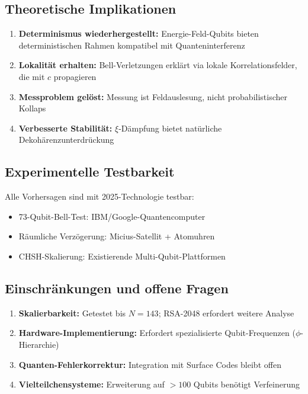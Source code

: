 \subsection{Theoretische Implikationen}

\begin{enumerate}
	\item \textbf{Determinismus wiederhergestellt:} Energie-Feld-Qubits bieten deterministischen Rahmen kompatibel mit Quanteninterferenz
	\item \textbf{Lokalität erhalten:} Bell-Verletzungen erklärt via lokale Korrelationsfelder, die mit $c$ propagieren
	\item \textbf{Messproblem gelöst:} Messung ist Feldauslesung, nicht probabilistischer Kollaps
	\item \textbf{Verbesserte Stabilität:} $\xi$-Dämpfung bietet natürliche Dekohärenzunterdrückung
\end{enumerate}

\subsection{Experimentelle Testbarkeit}

Alle Vorhersagen sind mit 2025-Technologie testbar:
\begin{itemize}
	\item 73-Qubit-Bell-Test: IBM/Google-Quantencomputer
	\item Räumliche Verzögerung: Micius-Satellit + Atomuhren
	\item CHSH-Skalierung: Existierende Multi-Qubit-Plattformen
\end{itemize}

\subsection{Einschränkungen und offene Fragen}

\begin{enumerate}
	\item \textbf{Skalierbarkeit:} Getestet bis $N=143$; RSA-2048 erfordert weitere Analyse
	\item \textbf{Hardware-Implementierung:} Erfordert spezialisierte Qubit-Frequenzen ($\phi$-Hierarchie)
	\item \textbf{Quanten-Fehlerkorrektur:} Integration mit Surface Codes bleibt offen
	\item \textbf{Vielteilchensysteme:} Erweiterung auf $>100$ Qubits benötigt Verfeinerung
\end{enumerate}

